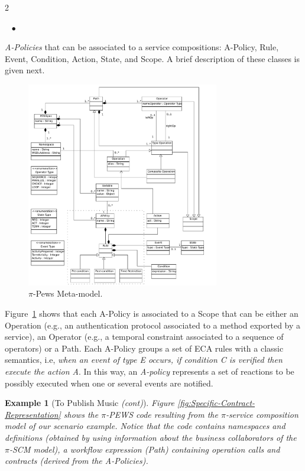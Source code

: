 \documentclass[12pt,twoside]{article}
\theoremstyle{plain}
\theoremstyle{plain}
\newtheorem{example}{Example}
\newenvironment{itemizedTrivlist}{\begin{list}{\rm ~\hspace{2mm} $\bullet$\ }
                                         {\setlength{\leftmargin}{0pt}
                                          \setlength{\rightmargin}{0pt}
                                          \setlength{\itemindent}{12pt}
                                          \setlength{\listparindent}{0pt}}}
                            {\end{list}}
\begin{document}
\begin{multicols}{2}
\begin{itemizedTrivlist}
\item {\em A-Policies} that can be associated to a service compositions:  {\sc A-Policy}, {\sc Rule}, {\sc Event}, {\sc Condition}, {\sc Action}, {\sc State}, and {\sc Scope}.
A brief description of these classes is given next.
\end{itemizedTrivlist}
%
\begin{figure}
\centering
\includegraphics[width=0.75\textwidth]{PEWSMetamodel}
\caption{$\pi$-{\sc Pews} Meta-model.}
\label{fig:PPEWSmetamodel}
\end{figure}

Figure~\ref{fig:PPEWSmetamodel} shows that each {\sc A-Policy} is associated to a {\sc Scope} that can be either an {\sc Operation} (e.g., an authentication protocol associated to a method exported by a service),  an {\sc Operator} (e.g., a temporal constraint associated to a sequence of operators) or a {\sc Path}.
Each {\sc A-Policy} groups a set of ECA rules with a classic semantics, i.e, {\em when an event of type E occurs, if condition C is verified then execute the action A}.
In this way, an {\em A-policy} represents a set of reactions to be possibly executed when one or several events are notified.


\begin{example}[To Publish Music \textit{(cont)}]\label{ex:toPublicMusic5}
Figure \ref{fig:Specific-Contract-Representation} shows the $\pi$-PEWS code resulting from the $\pi$-service composition model of our scenario example.
Notice that the code contains namespaces and definitions (obtained by using information about the business collaborators of the $\pi$-SCM model), a workflow expression \textit{(Path)} containing operation calls and contracts (derived from the \textit{A-Policies}).
\end{example}


\end{multicols}
\end{document}
